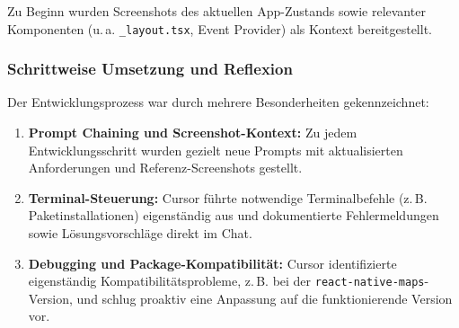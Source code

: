 Zu Beginn wurden Screenshots des aktuellen App-Zustands sowie relevanter
Komponenten (u.\,a. \texttt{\_layout.tsx}, Event Provider) als Kontext
bereitgestellt.

\subsubsection{Schrittweise Umsetzung und Reflexion}

Der Entwicklungsprozess war durch mehrere Besonderheiten gekennzeichnet:

\begin{enumerate}
      \item \textbf{Prompt Chaining und Screenshot-Kontext:} Zu jedem Entwicklungsschritt wurden gezielt neue Prompts mit aktualisierten Anforderungen und Referenz-Screenshots gestellt.
      \item \textbf{Terminal-Steuerung:} Cursor führte notwendige Terminalbefehle (z.\,B. Paketinstallationen) eigenständig aus und dokumentierte Fehlermeldungen sowie Lösungsvorschläge direkt im Chat.
      \item \textbf{Debugging und Package-Kompatibilität:} Cursor identifizierte eigenständig Kompatibilitätsprobleme, z.\,B. bei der \texttt{react-native-maps}-Version, und schlug proaktiv eine Anpassung auf die funktionierende Version vor.
\end{enumerate}

